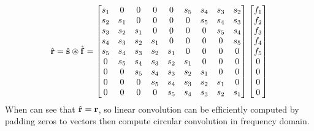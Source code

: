 \documentclass[revised,endfloat]{geophysics}
\begin{document}
\begin{equation}
\hat{\bf r} = \hat{\bf s} \circledast \hat{\bf f} = \begin{bmatrix}
s_1 & 0     & 0     & 0    & 0     & s_5 &  s_4 & s_3 & s_2 \\ 
s_2 & s_1 & 0     & 0    & 0     & 0     &  s_5 & s_4 & s_3 \\ 
s_3 & s_2 & s_1 & 0    & 0     & 0     &  0    & s_5 & s_4 \\ 
s_4 & s_3 & s_2 & s_1 & 0     & 0     &  0 & 0 & s_5 \\ 
s_5 & s_4 & s_3 & s_2 & s_1 & 0     &  0 & 0 & 0 \\ 
0    & s_5  & s_4 & s_3 & s_2 & s_1 &  0 & 0 & 0 \\ 
0    & 0     & s_5 & s_4  & s_3 & s_2 &  s_1 & 0 & 0 \\ 
0    & 0     & 0    & s_5  & s_4 & s_3 &  s_2 & s_1 & 0 \\ 
0    & 0     & 0    & 0     &  s_5 & s_4 &  s_3 & s_2 & s_1 \\ 
\end{bmatrix}
\begin{bmatrix}
f_1 \\
f_2 \\
f_3 \\
f_4 \\
f_5 \\
0 \\
0 \\
0 \\
0 \\
\end{bmatrix}
\label{eq10}
\end{equation}
When can see that $\hat{\bf r} = {\bf r}$, so linear convolution can be efficiently computed by padding zeros to vectors then compute circular convolution in frequency domain.
\end{document}
